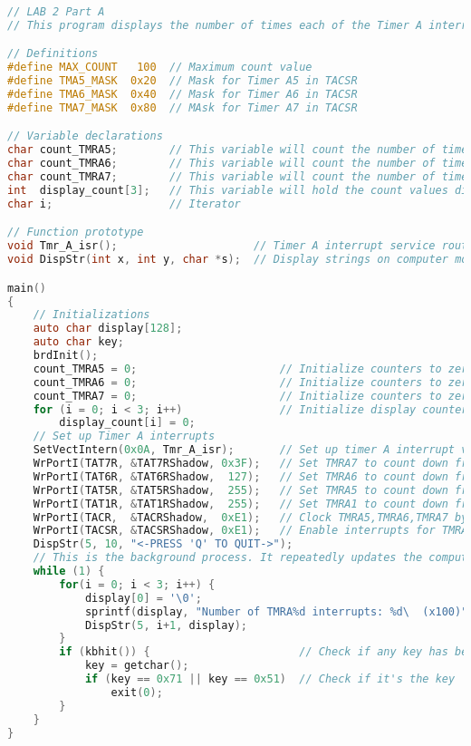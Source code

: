 \begin{lstlisting}[frame=single,language=C]
// LAB 2 Part A 
// This program displays the number of times each of the Timer A interrupts have occured on the computer monitor

// Definitions
#define MAX_COUNT   100  // Maximum count value
#define TMA5_MASK  0x20  // Mask for Timer A5 in TACSR
#define TMA6_MASK  0x40  // Mask for Timer A6 in TACSR
#define TMA7_MASK  0x80  // MAsk for Timer A7 in TACSR

// Variable declarations
char count_TMRA5;        // This variable will count the number of times Timer A5 has triggered an interrupted
char count_TMRA6;        // This variable will count the number of times Timer A6 has triggered an interrupted
char count_TMRA7;        // This variable will count the number of times Timer A7 has triggered an interrupted
int  display_count[3];   // This variable will hold the count values divided by 100
char i;                  // Iterator

// Function prototype
void Tmr_A_isr();                     // Timer A interrupt service routine
void DispStr(int x, int y, char *s);  // Display strings on computer monitor

main()
{
    // Initializations
    auto char display[128];
    auto char key;
    brdInit();
    count_TMRA5 = 0;                      // Initialize counters to zero
    count_TMRA6 = 0;                      // Initialize counters to zero
    count_TMRA7 = 0;                      // Initialize counters to zero
    for (i = 0; i < 3; i++)               // Initialize display counters to zero
        display_count[i] = 0;
    // Set up Timer A interrupts
    SetVectIntern(0x0A, Tmr_A_isr);       // Set up timer A interrupt vector
    WrPortI(TAT7R, &TAT7RShadow, 0x3F);   // Set TMRA7 to count down from 63
    WrPortI(TAT6R, &TAT6RShadow,  127);   // Set TMRA6 to count down from 127
    WrPortI(TAT5R, &TAT5RShadow,  255);   // Set TMRA5 to count down from 255
    WrPortI(TAT1R, &TAT1RShadow,  255);   // Set TMRA1 to count down from 255
    WrPortI(TACR,  &TACRShadow,  0xE1);   // Clock TMRA5,TMRA6,TMRA7 by TMRA1. Clock TMRA4 by PCLK/2. Set Timer A to trigger priority 1 interrupts
    WrPortI(TACSR, &TACSRShadow, 0xE1);   // Enable interrupts for TMRA5,TMRA6,TMRA7 only. Enable main clock for Timer A
    DispStr(5, 10, "<-PRESS 'Q' TO QUIT->");
    // This is the background process. It repeatedly updates the computer monitor with the values in the display_count array
    while (1) {
        for(i = 0; i < 3; i++) {
            display[0] = '\0';
            sprintf(display, "Number of TMRA%d interrupts: %d\  (x100)", i+5, display_count[i]);
            DispStr(5, i+1, display);
        }
        if (kbhit()) {                       // Check if any key has been pressed
            key = getchar();
            if (key == 0x71 || key == 0x51)  // Check if it's the key 'q' or 'Q'
                exit(0);
        }
    }
}


\end{lstlisting}
